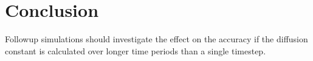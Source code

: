 \section{Conclusion}

Followup simulations should investigate the effect on the accuracy if the diffusion constant is calculated over longer time periods than a single timestep.